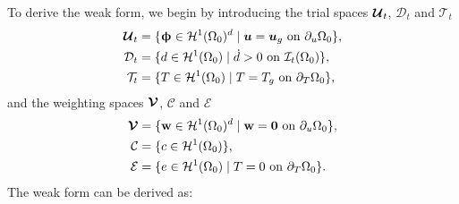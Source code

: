To derive the weak form, we begin by introducing the trial spaces $\boldsymbol{\mathcal{U}}_t$, $\mathcal{D}_t$ and $\mathcal{T}_t$
\begin{subequations}
  \begin{align}
    \boldsymbol{\mathcal{U}}_t & = \{ \boldsymbol{\upphi} \in \mathcal{H}^1(\Omega_0)^d \mid \boldsymbol{u} = \boldsymbol{u}_g \text{ on } \partial_u\Omega_0 \}, \\
    \mathcal{D}_t      & = \{ d \in \mathcal{H}^1(\Omega_0) \mid \dot{d} > 0 \text{ on } \mathcal{I}_t(\Omega_0) \},          \\
    \mathcal{T}_t      & = \{ T \in \mathcal{H}^1(\Omega_0) \mid T = T_g \text{ on } \partial_T\Omega_0 \},                   
  \end{align}
\end{subequations}
and the weighting spaces $\boldsymbol{\mathcal{V}}$, $\mathcal{C}$ and $\mathcal{E}$
\begin{subequations}
  \begin{align}
    \boldsymbol{\mathcal{V}} & = \{ \textbf{w} \in \mathcal{H}^1(\Omega_0)^d \mid \textbf{w} = \boldsymbol{0} \text{ on } \partial_u\Omega_0 \}, \\
    \mathcal{C}      & = \{ c \in \mathcal{H}^1(\Omega_0) \},                                                       \\
    \mathcal{E}      & = \{ e \in \mathcal{H}^1(\Omega_0) \mid T = 0 \text{ on } \partial_T\Omega_0 \}.              
  \end{align}
\end{subequations}
The weak form can be derived as:
